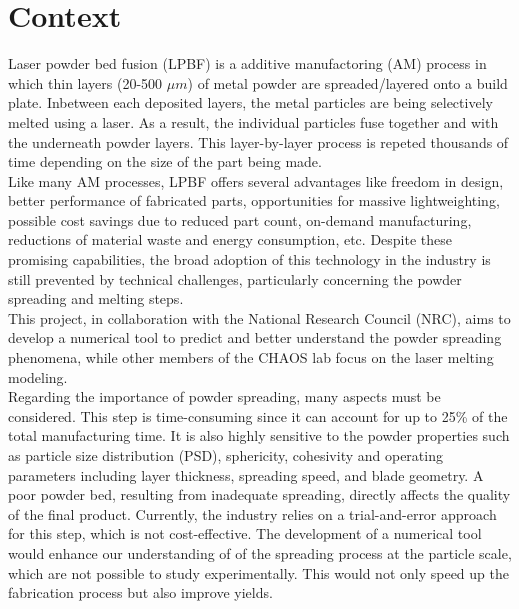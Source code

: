 \documentclass[12pt]{article}
\begin{document}
\pagestyle{fancy}

\section{Context}
Laser powder bed fusion (LPBF) is a additive manufactoring (AM) process in which thin layers (20-500 $\mu m$) of 
metal powder are spreaded/layered onto a build plate. Inbetween each deposited layers, the metal particles
are being selectively melted using a laser. As a result, the individual particles fuse together and with the 
underneath powder layers. 
This layer-by-layer process is repeted thousands of time depending on the size of the part being made. 
\\

\noindent Like many AM processes, LPBF offers several advantages like freedom in design, 
better performance of fabricated parts, opportunities for massive lightweighting, 
possible cost savings due to reduced part count, on-demand manufacturing, reductions 
of material waste and energy consumption, etc. Despite these promising capabilities, 
the broad adoption of this technology in the industry is still prevented by technical challenges, 
particularly concerning the powder spreading and melting steps.
\\

\noindent This project, in collaboration with the National Research Council (NRC), aims to develop a 
numerical tool to predict and better understand the powder spreading phenomena, 
while other members of the CHAOS lab focus on the laser melting modeling.
\\

\noindent Regarding the importance of powder spreading, many aspects must be considered. This step is 
time-consuming since it can account for up to 25\% of the total manufacturing time. It is also highly 
sensitive to the powder properties such as particle size distribution (PSD), sphericity, cohesivity and 
operating parameters including layer thickness, spreading speed, and blade geometry. A poor 
powder bed, resulting from inadequate spreading, directly affects the quality of the final 
product. Currently, the industry relies on a trial-and-error approach for this step, which is 
not cost-effective. The development of a numerical tool would enhance our understanding of 
of the spreading process at the particle scale, which are not possible to study experimentally. 
This would not only speed up the fabrication process but also improve yields.
\\
\end{document}
